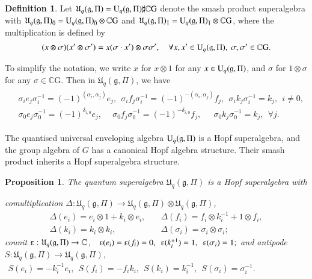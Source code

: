 \documentclass[12pt]{amsart}
\newtheorem{proposition}[theorem]{Proposition}
\theoremstyle{definition}
\newtheorem{definition}[theorem]{Definition}
\theoremstyle{remark}
\numberwithin{equation}{section}
\begin{document}
\begin{definition}\label{defi:smash product}
Let ${{\mathfrak U}}_q({{\mathfrak g}},\Pi)={{\rm U}}_q({{\mathfrak g}},\Pi)\sharp{{\mathbb C}} \mathrm{G}$
denote the smash product superalgebra with ${{\mathfrak U}}_q({{\mathfrak g}},\Pi)_{\bar 0}={{\rm U}}_q({{\mathfrak g}},\Pi)_{\bar 0}\otimes{{\mathbb C}} \mathrm{G}$ and ${{\mathfrak U}}_q({{\mathfrak g}},\Pi)_{\bar 1}={{\rm U}}_q({{\mathfrak g}},\Pi)_{\bar 1}\otimes{{\mathbb C}} \mathrm{G}$, where the multiplication is defined by
\[
\begin{aligned}
(x\otimes \sigma)(x'\otimes \sigma')=x(\sigma\cdot x')\otimes \sigma\sigma', \quad \forall x, x'\in {{\rm U}}_q({{\mathfrak g}},\Pi), \ \sigma,\sigma'\in {{\mathbb C}}\mathrm{G}.
\end{aligned}
\]
\end{definition}
To simplify the notation, we write $x$ for  $x\otimes 1$ for any $x\in{{\rm U}}_q({{\mathfrak g}},\Pi)$, and
$\sigma$ for $1\otimes \sigma$ for any $\sigma\in{{\mathbb C}}\mathrm{G}$. Then in ${{\mathfrak U}}_q({{\mathfrak g}}, \Pi)$, we have
\begin{eqnarray}\label{eq:sigma-act}
\begin{aligned}
&\sigma_i e_j\sigma_i^{-1}=(-1)^{(\alpha_i,\alpha_j)}e_j,\ \
\sigma_i f_j\sigma_i^{-1}=(-1)^{-(\alpha_i,\alpha_j)}f_j, \ \
\sigma_i k_j\sigma_i^{-1}=k_j, \ \  i\ne 0,\\
&\sigma_0 e_j \sigma^{-1}_0=(-1)^{\delta_{i,0}}e_j,\ \quad \sigma_0 f_j \sigma^{-1}_0=(-1)^{-\delta_{i,0}}f_j,\ \ \quad \sigma_0 k_j \sigma^{-1}_0=k_j,  \ \  \forall j.
\end{aligned}
\end{eqnarray}

The quantised universal enveloping algebra ${{\rm U}}_q({{\mathfrak g}}, \Pi)$ is a Hopf superalgebra, and the group algebra of $G$ has a canonical Hopf algebra structure. Their smash product inherits a Hopf superalgebra structure.
\begin{proposition}\label{prop:hopf}
The quantum superalgebra ${{\mathfrak U}}_q({{\mathfrak g}},\Pi)$ is a Hopf superalgebra with

\noindent
comultiplication ${\Delta}:{{\mathfrak U}}_q({{\mathfrak g}},\Pi)\rightarrow {{\mathfrak U}}_q({{\mathfrak g}},\Pi)\otimes {{\mathfrak U}}_q({{\mathfrak g}},\Pi)$,
\[
\begin{aligned}
{\Delta}(e_i)=e_i\otimes 1+k_i\otimes e_i, &\quad
{\Delta}(f_i)=f_i\otimes k_i^{-1}+1\otimes f_i,\\
{\Delta}(k_i)=k_i\otimes k_i, &\quad
{\Delta}(\sigma_i)=\sigma_i\otimes\sigma_i;
\end{aligned}
\]
counit ${\varepsilonup}:{{\mathfrak U}}_q({{\mathfrak g}},\Pi)\rightarrow {\mathbb{{C}}}$,\ \
$
{\varepsilonup}(e_i)={\varepsilonup}(f_i)=0, \ \ {\varepsilonup}(k_i^{\pm1})=1, \ \ {\varepsilonup}(\sigma_i)=1;
$
and 
 antipode $S:{{\mathfrak U}}_q({{\mathfrak g}},\Pi)\rightarrow {{\mathfrak U}}_q({{\mathfrak g}},\Pi)$, \ \ 
$
\begin{aligned}
S(e_i)=-k_i^{-1}e_i,\ \ S(f_i)=-f_ik_i, \ \ S(k_i)=k_i^{-1}, \ \ S(\sigma_i)=\sigma_i^{-1}.
\end{aligned}
$
\end{proposition}
\end{document}
